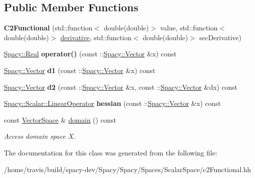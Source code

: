 \subsection*{Public Member Functions}
\begin{DoxyCompactItemize}
\item 
\hypertarget{classSpacy_1_1Scalar_1_1C2Functional_a6458c77ba0a55aace7bd3e739078b25b}{{\bfseries C2\-Functional} (std\-::function$<$ double(double)$>$ value, std\-::function$<$ double(double)$>$ \hyperlink{namespaceSpacy_a002fe344fa6d04a6ac59a74ea25fddb6}{derivative}, std\-::function$<$ double(double)$>$ sec\-Derivative)}\label{classSpacy_1_1Scalar_1_1C2Functional_a6458c77ba0a55aace7bd3e739078b25b}

\item 
\hypertarget{classSpacy_1_1Scalar_1_1C2Functional_a925d8325d3d58de9ccf82fb4c20a7f87}{\hyperlink{classSpacy_1_1Real}{Spacy\-::\-Real} {\bfseries operator()} (const \-::\hyperlink{classSpacy_1_1Vector}{Spacy\-::\-Vector} \&x) const }\label{classSpacy_1_1Scalar_1_1C2Functional_a925d8325d3d58de9ccf82fb4c20a7f87}

\item 
\hypertarget{classSpacy_1_1Scalar_1_1C2Functional_ac6baf3f5a3e1fbb1a2dc8172b0d471d5}{\hyperlink{classSpacy_1_1Vector}{Spacy\-::\-Vector} {\bfseries d1} (const \-::\hyperlink{classSpacy_1_1Vector}{Spacy\-::\-Vector} \&x) const }\label{classSpacy_1_1Scalar_1_1C2Functional_ac6baf3f5a3e1fbb1a2dc8172b0d471d5}

\item 
\hypertarget{classSpacy_1_1Scalar_1_1C2Functional_adcb4d9ed480a86199c82f1d1a97fe6dc}{\hyperlink{classSpacy_1_1Vector}{Spacy\-::\-Vector} {\bfseries d2} (const \-::\hyperlink{classSpacy_1_1Vector}{Spacy\-::\-Vector} \&x, const \-::\hyperlink{classSpacy_1_1Vector}{Spacy\-::\-Vector} \&dx) const }\label{classSpacy_1_1Scalar_1_1C2Functional_adcb4d9ed480a86199c82f1d1a97fe6dc}

\item 
\hypertarget{classSpacy_1_1Scalar_1_1C2Functional_aee5a5f9a601aa339c67ec57e44806343}{\hyperlink{structSpacy_1_1Scalar_1_1LinearOperator}{Spacy\-::\-Scalar\-::\-Linear\-Operator} {\bfseries hessian} (const \-::\hyperlink{classSpacy_1_1Vector}{Spacy\-::\-Vector} \&x) const }\label{classSpacy_1_1Scalar_1_1C2Functional_aee5a5f9a601aa339c67ec57e44806343}

\item 
\hypertarget{classSpacy_1_1FunctionalBase_a2d3397deb9fa1ad85ed04e37a03b3aa6}{const \hyperlink{classSpacy_1_1VectorSpace}{Vector\-Space} \& \hyperlink{classSpacy_1_1FunctionalBase_a2d3397deb9fa1ad85ed04e37a03b3aa6}{domain} () const }\label{classSpacy_1_1FunctionalBase_a2d3397deb9fa1ad85ed04e37a03b3aa6}

\begin{DoxyCompactList}\small\item\em Access domain space $X$. \end{DoxyCompactList}\end{DoxyCompactItemize}


The documentation for this class was generated from the following file\-:\begin{DoxyCompactItemize}
\item 
/home/travis/build/spacy-\/dev/\-Spacy/\-Spacy/\-Spaces/\-Scalar\-Space/c2\-Functional.\-hh\end{DoxyCompactItemize}
